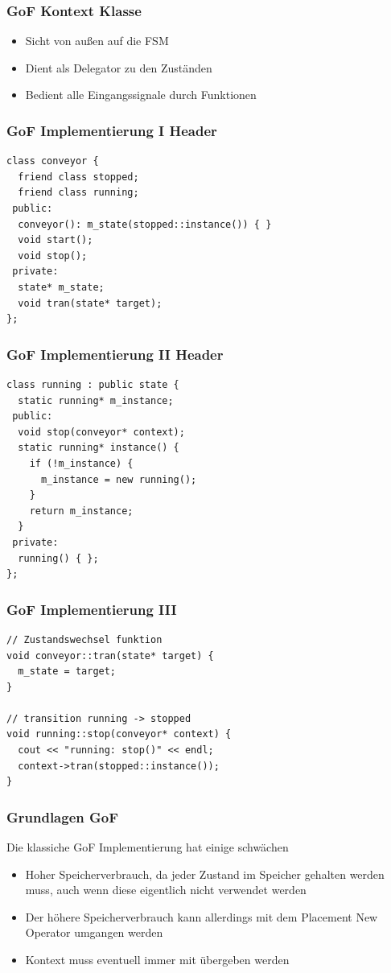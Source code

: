 \documentclass{beamer}
\begin{document}
\begin{frame}
 \frametitle{GoF Kontext Klasse}
 \begin{itemize}
  \item Sicht von au{\ss}en auf die FSM
  \item Dient als Delegator zu den Zust\"anden
  \item Bedient alle Eingangssignale durch Funktionen
 \end{itemize}
\end{frame}

\begin{frame}[fragile]
 \frametitle{GoF Implementierung I Header}
 \begin{lstlisting}
class conveyor {
  friend class stopped;
  friend class running;
 public:
  conveyor(): m_state(stopped::instance()) { }
  void start();
  void stop();
 private:
  state* m_state;
  void tran(state* target);
};
 \end{lstlisting}
\end{frame}

\begin{frame}[fragile]
 \frametitle{GoF Implementierung II Header}
 \begin{lstlisting}
class running : public state {
  static running* m_instance;
 public:
  void stop(conveyor* context);
  static running* instance() {
    if (!m_instance) {
      m_instance = new running();
    }
    return m_instance;
  }
 private:
  running() { };
};
 \end{lstlisting}
\end{frame}

\begin{frame}[fragile]
 \frametitle{GoF Implementierung III}
 \begin{lstlisting}
// Zustandswechsel funktion
void conveyor::tran(state* target) {
  m_state = target;
}

// transition running -> stopped
void running::stop(conveyor* context) {
  cout << "running: stop()" << endl;
  context->tran(stopped::instance());
}
 \end{lstlisting}
\end{frame}


\begin{frame}
 \frametitle{Grundlagen GoF}
 Die klassiche GoF Implementierung hat einige schw\"achen
 \begin{itemize}
  \item Hoher Speicherverbrauch, da jeder Zustand im Speicher gehalten werden muss, auch wenn diese eigentlich nicht verwendet werden
  \item Der h\"ohere Speicherverbrauch kann allerdings mit dem Placement New Operator umgangen werden
  \item Kontext muss eventuell immer mit \"ubergeben werden
 \end{itemize}
\end{frame}
\end{document}
